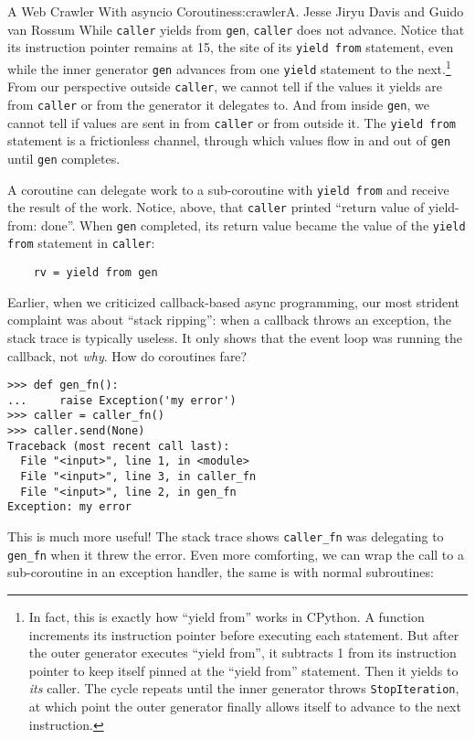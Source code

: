 \begin{aosachapter}{A Web Crawler With asyncio Coroutines}{s:crawler}{A. Jesse Jiryu Davis and Guido van Rossum}
While \texttt{caller} yields from \texttt{gen}, \texttt{caller} does not
advance. Notice that its instruction pointer remains at 15, the site of
its \texttt{yield from} statement, even while the inner generator
\texttt{gen} advances from one \texttt{yield} statement to the
next.\footnote{In fact, this is exactly how ``yield from'' works in
  CPython. A function increments its instruction pointer before
  executing each statement. But after the outer generator executes
  ``yield from'', it subtracts 1 from its instruction pointer to keep
  itself pinned at the ``yield from'' statement. Then it yields to
  \emph{its} caller. The cycle repeats until the inner generator throws
  \texttt{StopIteration}, at which point the outer generator finally
  allows itself to advance to the next instruction.} From our
perspective outside \texttt{caller}, we cannot tell if the values it
yields are from \texttt{caller} or from the generator it delegates to.
And from inside \texttt{gen}, we cannot tell if values are sent in from
\texttt{caller} or from outside it. The \texttt{yield from} statement is
a frictionless channel, through which values flow in and out of
\texttt{gen} until \texttt{gen} completes.

A coroutine can delegate work to a sub-coroutine with
\texttt{yield from} and receive the result of the work. Notice, above,
that \texttt{caller} printed ``return value of yield-from: done''. When
\texttt{gen} completed, its return value became the value of the
\texttt{yield from} statement in \texttt{caller}:

\begin{verbatim}
    rv = yield from gen
\end{verbatim}

Earlier, when we criticized callback-based async programming, our most
strident complaint was about ``stack ripping'': when a callback throws
an exception, the stack trace is typically useless. It only shows that
the event loop was running the callback, not \emph{why}. How do
coroutines fare?

\begin{verbatim}
>>> def gen_fn():
...     raise Exception('my error')
>>> caller = caller_fn()
>>> caller.send(None)
Traceback (most recent call last):
  File "<input>", line 1, in <module>
  File "<input>", line 3, in caller_fn
  File "<input>", line 2, in gen_fn
Exception: my error
\end{verbatim}

This is much more useful! The stack trace shows \texttt{caller\_fn} was
delegating to \texttt{gen\_fn} when it threw the error. Even more
comforting, we can wrap the call to a sub-coroutine in an exception
handler, the same is with normal subroutines:


\end{aosachapter}
